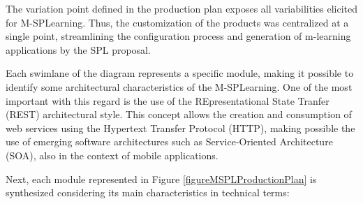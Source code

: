 The variation point defined in the production plan exposes all variabilities elicited for M-SPLearning. Thus, the customization of the products was centralized at a single point, streamlining the configuration process and generation of m-learning applications by the SPL proposal.

Each swimlane of the diagram represents a specific module, making it possible to identify some architectural characteristics of the M-SPLearning. One of the most important with this regard is the use of the REpresentational State Tranfer (REST) \cite{fielding00} architectural style. This concept allows the creation and consumption of web services using the Hypertext Transfer Protocol (HTTP), making possible the use of emerging software architectures such as Service-Oriented Architecture (SOA), also in the context of mobile applications.

Next, each module represented in Figure \ref{figureMSPLProductionPlan} is synthesized considering its main characteristics in technical terms:

